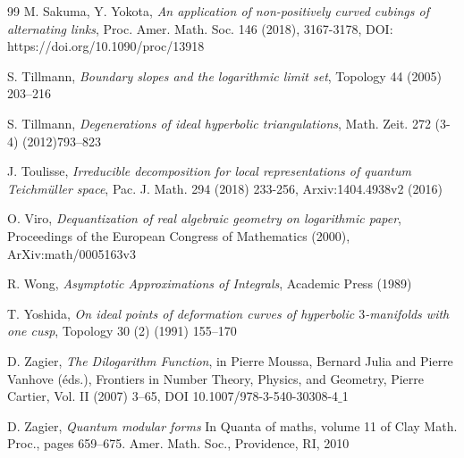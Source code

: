 \documentclass[11pt]{amsart}
\begin{document}
\begin{thebibliography}{99}
 M. Sakuma, Y. Yokota, \emph{An application of non-positively curved cubings of alternating links}, Proc. Amer. Math. Soc. 146 (2018), 3167-3178, DOI: https://doi.org/10.1090/proc/13918 

 S. Tillmann, \emph{Boundary slopes and the logarithmic limit set}, Topology 44 (2005) 203--216

 S. Tillmann, \emph{Degenerations of ideal hyperbolic triangulations}, Math. Zeit. 272 (3-4) (2012)793--823

 J. Toulisse, \emph{Irreducible decomposition for local representations of quantum Teichm\"uller space}, Pac. J. Math. 294 (2018) 233-256, Arxiv:1404.4938v2 (2016)

 O. Viro, \emph{Dequantization of real algebraic geometry on logarithmic paper}, Proceedings of the European Congress of Mathematics (2000), ArXiv:math/0005163v3

 R. Wong, \emph{Asymptotic Approximations of Integrals}, Academic Press (1989)

 T. Yoshida, \emph{On ideal points of deformation curves of hyperbolic $3$-manifolds with one cusp}, Topology 30 (2) (1991) 155--170

 D. Zagier, {\it The Dilogarithm Function}, in Pierre Moussa, Bernard Julia and Pierre Vanhove (éds.), Frontiers in Number Theory, Physics, and Geometry, Pierre Cartier, Vol. II (2007) 3--65, DOI 10.1007/978-3-540-30308-4$\_$1

 D. Zagier, {\it Quantum modular forms} In Quanta of maths, volume 11 of Clay Math. Proc., pages 659–675. Amer. Math. Soc., Providence, RI, 2010

\end{thebibliography}
\end{document}
